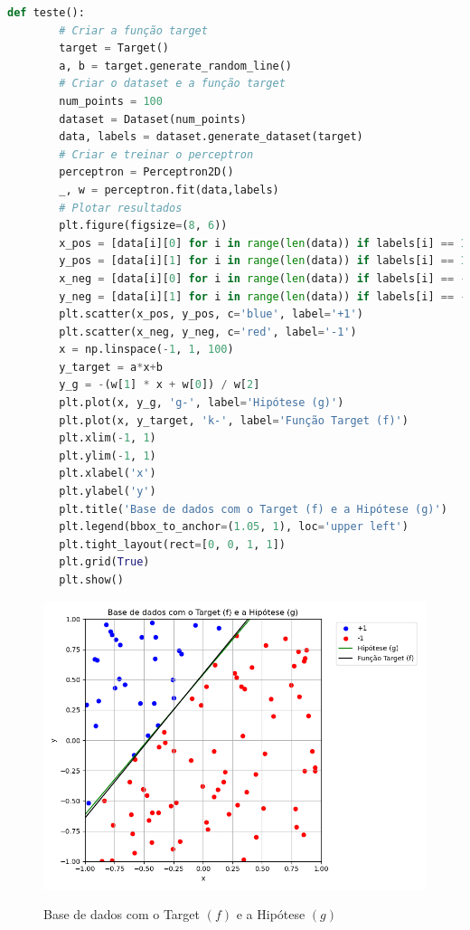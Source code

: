 \begin{lstlisting}[language=Python, caption=Teste das classes, label=cod:perceptron_teste]
    def teste():
        # Criar a função target
        target = Target()
        a, b = target.generate_random_line()
        # Criar o dataset e a função target
        num_points = 100
        dataset = Dataset(num_points)
        data, labels = dataset.generate_dataset(target)
        # Criar e treinar o perceptron
        perceptron = Perceptron2D()
        _, w = perceptron.fit(data,labels)
        # Plotar resultados
        plt.figure(figsize=(8, 6))
        x_pos = [data[i][0] for i in range(len(data)) if labels[i] == 1]
        y_pos = [data[i][1] for i in range(len(data)) if labels[i] == 1]
        x_neg = [data[i][0] for i in range(len(data)) if labels[i] == -1]
        y_neg = [data[i][1] for i in range(len(data)) if labels[i] == -1]
        plt.scatter(x_pos, y_pos, c='blue', label='+1')
        plt.scatter(x_neg, y_neg, c='red', label='-1')
        x = np.linspace(-1, 1, 100)
        y_target = a*x+b
        y_g = -(w[1] * x + w[0]) / w[2]
        plt.plot(x, y_g, 'g-', label='Hipótese (g)')
        plt.plot(x, y_target, 'k-', label='Função Target (f)')
        plt.xlim(-1, 1)
        plt.ylim(-1, 1)
        plt.xlabel('x')
        plt.ylabel('y')
        plt.title('Base de dados com o Target (f) e a Hipótese (g)')
        plt.legend(bbox_to_anchor=(1.05, 1), loc='upper left')
        plt.tight_layout(rect=[0, 0, 1, 1])
        plt.grid(True)
        plt.show()

\end{lstlisting}

\begin{figure}[H]
    \caption{Base de dados com o Target $(f)$ e a Hipótese $(g)$}
       \centering
       \includegraphics[width=\textwidth]{perceptron_plot.png}
    \label{fig:perceptron_plot}
\end{figure}


